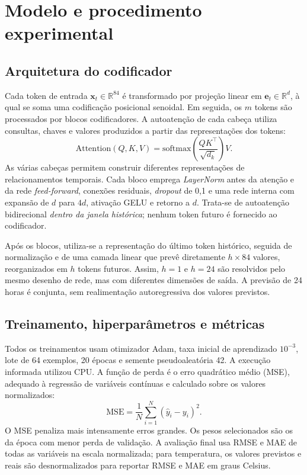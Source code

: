 \documentclass[conference,a4paper]{IEEEtran}
\begin{document}
\section{Modelo e procedimento experimental}
\subsection{Arquitetura do codificador}
Cada token de entrada $\mathbf{x}_t\in\mathbb{R}^{84}$ é transformado por projeção linear em $\mathbf{e}_t\in\mathbb{R}^{d}$, à qual se soma uma codificação posicional senoidal. Em seguida, os $m$ tokens são processados por blocos codificadores. A autoatenção de cada cabeça utiliza consultas, chaves e valores produzidos a partir das representações dos tokens:
\begin{equation}
 \mathrm{Attention}(Q,K,V)=\mathrm{softmax}\!\left(\frac{QK^\top}{\sqrt{d_k}}\right)V.
\end{equation}
As várias cabeças permitem construir diferentes representações de relacionamentos temporais. Cada bloco emprega \emph{LayerNorm} antes da atenção e da rede \emph{feed-forward}, conexões residuais, \emph{dropout} de 0,1 e uma rede interna com expansão de $d$ para $4d$, ativação GELU e retorno a $d$. Trata-se de autoatenção bidirecional \emph{dentro da janela histórica}; nenhum token futuro é fornecido ao codificador.

Após os blocos, utiliza-se a representação do último token histórico, seguida de normalização e de uma camada linear que prevê diretamente $h\times84$ valores, reorganizados em $h$ tokens futuros. Assim, $h=1$ e $h=24$ são resolvidos pelo mesmo desenho de rede, mas com diferentes dimensões de saída. A previsão de 24 horas é conjunta, sem realimentação autoregressiva dos valores previstos.

\subsection{Treinamento, hiperparâmetros e métricas}
Todos os treinamentos usam otimizador Adam, taxa inicial de aprendizado $10^{-3}$, lote de 64 exemplos, 20 épocas e semente pseudoaleatória 42. A execução informada utilizou CPU. A função de perda é o erro quadrático médio (MSE), adequado à regressão de variáveis contínuas e calculado sobre os valores normalizados:
\begin{equation}
 \mathrm{MSE}=\frac{1}{N}\sum_{i=1}^{N}(\hat y_i-y_i)^2.
\end{equation}
O MSE penaliza mais intensamente erros grandes. Os pesos selecionados são os da época com menor perda de validação. A avaliação final usa RMSE e MAE de todas as variáveis na escala normalizada; para temperatura, os valores previstos e reais são desnormalizados para reportar RMSE e MAE em graus Celsius.
\end{document}
